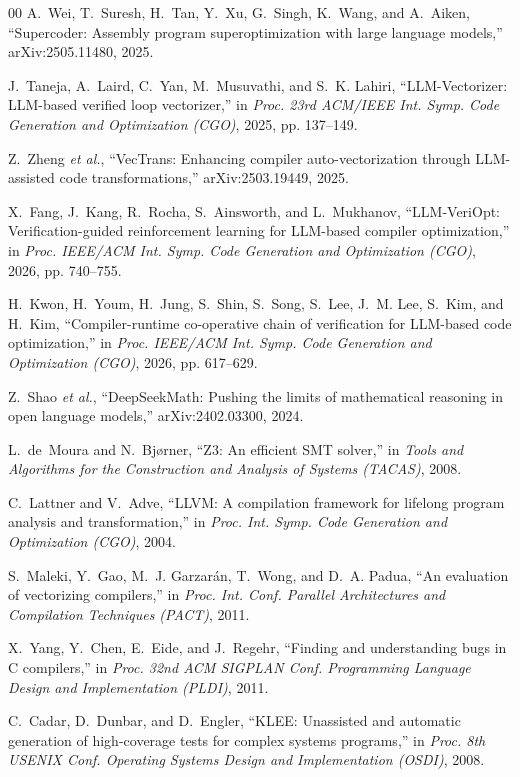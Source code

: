 \documentclass[conference]{IEEEtran}
\begin{document}
\begin{thebibliography}{00}
A.~Wei, T.~Suresh, H.~Tan, Y.~Xu, G.~Singh, K.~Wang, and A.~Aiken,
``Supercoder: Assembly program superoptimization with large language models,''
arXiv:2505.11480, 2025.

J.~Taneja, A.~Laird, C.~Yan, M.~Musuvathi, and S.~K. Lahiri, ``LLM-Vectorizer:
LLM-based verified loop vectorizer,'' in \emph{Proc. 23rd ACM/IEEE Int. Symp.
Code Generation and Optimization (CGO)}, 2025, pp. 137--149.

Z.~Zheng \emph{et al.}, ``VecTrans: Enhancing compiler auto-vectorization
through LLM-assisted code transformations,'' arXiv:2503.19449, 2025.

X.~Fang, J.~Kang, R.~Rocha, S.~Ainsworth, and L.~Mukhanov, ``LLM-VeriOpt:
Verification-guided reinforcement learning for LLM-based compiler
optimization,'' in \emph{Proc. IEEE/ACM Int. Symp. Code Generation and
Optimization (CGO)}, 2026, pp. 740--755.

H.~Kwon, H.~Youm, H.~Jung, S.~Shin, S.~Song, S.~Lee, J.~M. Lee, S.~Kim, and
H.~Kim, ``Compiler-runtime co-operative chain of verification for LLM-based
code optimization,'' in \emph{Proc. IEEE/ACM Int. Symp. Code Generation and
Optimization (CGO)}, 2026, pp. 617--629.

Z.~Shao \emph{et al.}, ``DeepSeekMath: Pushing the limits of mathematical
reasoning in open language models,'' arXiv:2402.03300, 2024.

L.~de~Moura and N.~Bj{\o}rner, ``Z3: An efficient SMT solver,'' in \emph{Tools
and Algorithms for the Construction and Analysis of Systems (TACAS)}, 2008.

C.~Lattner and V.~Adve, ``LLVM: A compilation framework for lifelong program
analysis and transformation,'' in \emph{Proc. Int. Symp. Code Generation and
Optimization (CGO)}, 2004.

S.~Maleki, Y.~Gao, M.~J. Garzar\'{a}n, T.~Wong, and D.~A. Padua, ``An
evaluation of vectorizing compilers,'' in \emph{Proc. Int. Conf. Parallel
Architectures and Compilation Techniques (PACT)}, 2011.

X.~Yang, Y.~Chen, E.~Eide, and J.~Regehr, ``Finding and understanding bugs in C
compilers,'' in \emph{Proc. 32nd ACM SIGPLAN Conf. Programming Language Design
and Implementation (PLDI)}, 2011.

C.~Cadar, D.~Dunbar, and D.~Engler, ``KLEE: Unassisted and automatic generation
of high-coverage tests for complex systems programs,'' in \emph{Proc. 8th
USENIX Conf. Operating Systems Design and Implementation (OSDI)}, 2008.


\end{thebibliography}
\end{document}
